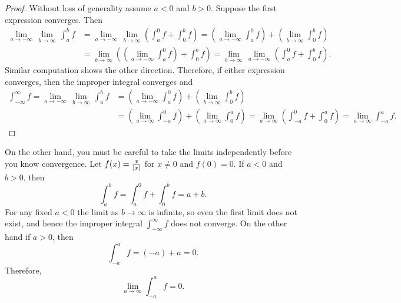 \begin{proof}
Without loss of generality assume $a < 0$ and $b > 0$.  Suppose
the first expression converges.  Then
\begin{equation*}
\begin{split}
\lim_{a \to -\infty} \, \lim_{b \to \infty} \, \int_a^b f
& =
\lim_{a \to -\infty} \, \lim_{b \to \infty}
\left(
\int_a^0 f
+
\int_0^b f
\right)
=
\left(
\lim_{a \to -\infty}
\int_a^0 f
\right)
+
\left(
 \lim_{b \to \infty}
\int_0^b f
\right) \\
& = 
 \lim_{b \to \infty}
\left(
\left(
\lim_{a \to -\infty}
\int_a^0 f
\right) 
+
\int_0^b f
\right)
=
 \lim_{b \to \infty} \,
\lim_{a \to -\infty}
\left(
\int_a^0 f
+
\int_0^b f
\right)  .
\end{split}
\end{equation*}
Similar computation shows the other direction.  Therefore, if
either expression converges, then the improper integral converges
and
\begin{equation*}
\begin{split}
\int_{-\infty}^\infty f
=
\lim_{a \to -\infty} \, \lim_{b \to \infty} \, \int_a^b f
& =
\left(
\lim_{a \to -\infty}
\int_a^0 f
\right)
+
\left(
 \lim_{b \to \infty}
\int_0^b f
\right)
\\
& =
\left(
\lim_{a \to \infty}
\int_{-a}^0 f
\right)
+
\left(
 \lim_{a \to \infty}
\int_0^a f
\right)
=
\lim_{a \to \infty}
\left(
\int_{-a}^0 f
+
\int_0^a f
\right)
=
\lim_{a \to \infty}
\int_{-a}^a f .
\end{split}
\end{equation*}
\end{proof}

\begin{example}
On the other hand, you must be careful to
take the limits independently before you know convergence.  Let
$f(x) = \frac{x}{\left\lvert {x} \right\rvert}$ for $x \not= 0$ and $f(0) = 0$.
If $a < 0$ and $b > 0$, then
\begin{equation*}
\int_{a}^b f
=
\int_{a}^0 f
+
\int_{0}^b f
=
a+b .
\end{equation*}
For any fixed $a < 0$ the limit as $b \to \infty$ is infinite, so even
the first limit does not exist, and hence the improper integral
$\int_{-\infty}^\infty f$
does not converge.  On the other hand if $a > 0$, then
\begin{equation*}
\int_{-a}^{a} f
=
(-a)+a = 0 .
\end{equation*}
Therefore,
\begin{equation*}
\lim_{a\to\infty}
\int_{-a}^{a} f
= 0 .
\end{equation*}
\end{example}

